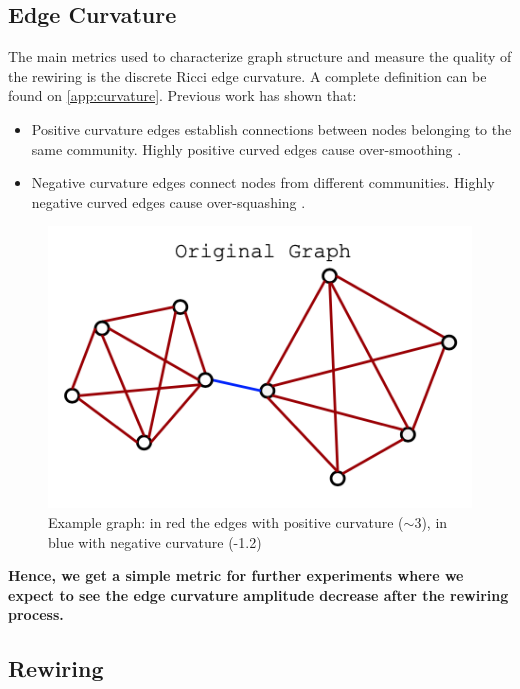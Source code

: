 \documentclass{article}
\theoremstyle{plain}
\theoremstyle{definition}
\theoremstyle{remark}
\begin{document}
\subsection{Edge Curvature}
The main metrics used to characterize graph structure and measure the quality
of the rewiring is the discrete Ricci edge curvature. A complete definition can be found on 
\cref{app:curvature}. Previous work has shown that:
\begin{itemize}
    \item Positive curvature edges establish connections between 
        nodes belonging to the same community.
        Highly positive curved edges cause over-smoothing \cite{nguyen2023revisiting}.
                
    \item Negative curvature edges connect nodes from different communities.
        Highly negative curved edges cause over-squashing \cite{topping2022understandingoversquashingbottlenecksgraphs}.
\end{itemize}
\begin{figure}[ht]
    \label{fig:edge_curvature}
    \vskip -0.2in
    \begin{center}
    \includegraphics[width=0.6\columnwidth]{figures/original_graph.png}
    \caption{\scriptsize Example graph: in red the edges with positive curvature ($\sim 3$), 
    in blue with negative curvature (-1.2) \cite{attali2024delaunay}}
    \end{center}
    \vskip -0.2in
\end{figure}
\textbf{Hence, we get a simple metric for further experiments where we expect to see the 
edge curvature amplitude decrease after the rewiring process.}

\subsection{Rewiring}
\end{document}
